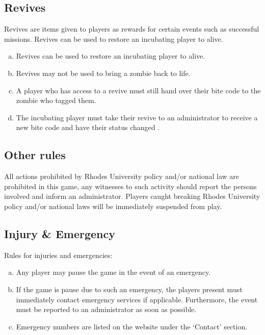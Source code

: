 \documentclass[a4paper,12pt]{article}
\begin{document}
\subsection{Revives}
Revives are items given to players as rewards for certain events such as successful missions. Revives can be used to restore an incubating player to alive.
\begin{enumerate}[(a)]
	\item Revives can be used to restore an incubating player to alive.
	\item Revives may not be used to bring a zombie back to life.
	\item A player who has access to a revive must still hand over their bite code to the zombie who tagged them.
	\item The incubating player must take their revive to an administrator to receive a new bite code and have their status changed .

\end{enumerate}

\subsection{Other rules}
All actions prohibited by Rhodes University policy and/or national law are prohibited in this game, any witnesses to such activity should report the persons involved and inform an administrator. Players caught breaking Rhodes University policy and/or national laws will be immediately suspended from play.

\subsection{Injury \& Emergency}

Rules for injuries and emergencies:
\begin{enumerate}[(a)]
    \item Any player may pause the game in the event of an emergency.
    \item If the game is pause due to such an emergency, the players present must immediately contact emergency services if applicable. Furthermore, the event must be reported to an administrator as soon as possible.
    \item Emergency numbers are listed on the website under the `Contact' section.
\end{enumerate}
\end{document}
